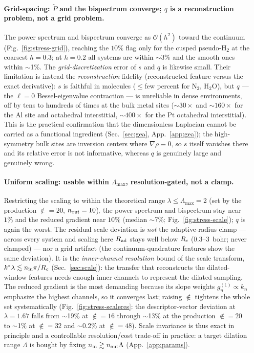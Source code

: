 \paragraph*{Grid-spacing: $\tilde P$ and the bispectrum converge; $q$ is a
reconstruction problem, not a grid problem.}
The power spectrum and bispectrum converge as $\mathcal O(h^2)$ toward the continuum
(Fig.~\ref{fig:stress-grid}), reaching the $10\%$ flag only for the cusped pseudo-H$_2$
at the coarsest $h=0.3$; at $h=0.2$ all systems are within $\sim$3\% and the smooth
ones within $\sim$1\%. The \emph{grid-discretization} error of $s$ and $q$ is likewise
small. Their limitation is instead the \emph{reconstruction} fidelity (reconstructed
feature versus the exact derivative): $s$ is faithful in molecules ($\le$few percent
for N$_2$, H$_2$O), but $q$ --- the $\ell=0$ Bessel-eigenvalue contraction --- is
unreliable in dense environments, off by tens to hundreds of times at the bulk metal
sites ($\sim\!30\times$ and $\sim\!160\times$ for the Al site and octahedral
interstitial, $\sim\!400\times$ for the Pt octahedral interstitial).
This is the practical confirmation that the dimensionless Laplacian cannot be carried
as a functional ingredient (Sec.~\ref{sec:gea}, App.~\ref{app:gea}); the high-symmetry
bulk sites are inversion centers where $\nabla\rho\equiv0$, so $s$ itself vanishes
there and its relative error is not informative, whereas $q$ is genuinely large and
genuinely wrong.

\paragraph*{Uniform scaling: usable within $\Lambda_{\max}$, resolution-gated, not a clamp.}
Restricting the scaling to within the theoretical range $\lambda\le\Lambda_{\max}=2$ (set
by the production $\nin=20$, $n_{\mathrm{out}}=10$), the power spectrum and bispectrum stay near
$1\%$ and the reduced gradient near $10\%$ (median $\sim$7\%; Fig.~\ref{fig:stress-scale});
$q$ is again the worst. The residual scale deviation is \emph{not} the adaptive-radius
clamp --- across every system and scaling here $R_{\mathrm{ad}}$ stays well below $R_{c}$
($0.3$--$3$~bohr; never clamped) --- nor a grid artifact (the continuum-quadrature
features show the same deviation). It is the \emph{inner-channel resolution} bound of the
scale transform, $k^*\lambda\lesssim n_{\mathrm{in}}\pi/R_{c}$ (Sec.~\ref{sec:scale}): the transfer that
reconstructs the dilated-window features needs enough inner channels to represent the
dilated sampling. The reduced gradient is the most demanding because its slope weights
$g^{(1)}_n\propto k_n$ emphasize the highest channels, so it converges last; raising
$\nin$ tightens the whole set systematically (Fig.~\ref{fig:stress-scaleres}: the
descriptor-vector deviation at $\lambda=1.67$ falls from $\sim$19\% at $\nin=16$ through
$\sim$13\% at the production $\nin=20$ to $\sim$1\% at $\nin=32$ and $\sim$0.2\% at
$\nin=48$). Scale invariance is thus exact in principle and a controllable
resolution/cost trade-off in practice: a target dilation range $\Lambda$ is bought by
fixing $n_{\mathrm{in}}\gtrsim n_{\mathrm{out}}\Lambda$ (App.~\ref{app:params}).

